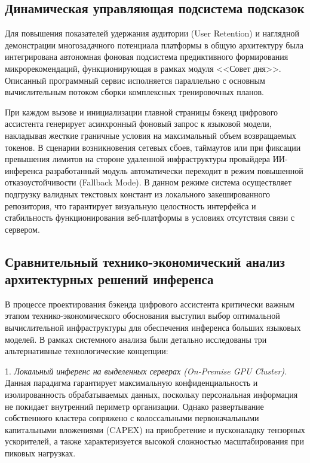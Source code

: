 \documentclass[14pt, a4paper]{extarticle}
\begin{document}
\subsection{Динамическая управляющая подсистема подсказок}

Для повышения показателей удержания аудитории (User Retention) и наглядной демонстрации многозадачного потенциала платформы в общую архитектуру была интегрирована автономная фоновая подсистема предиктивного формирования микрорекомендаций, функционирующая в рамках модуля <<Совет дня>>. Описанный программный сервис исполняется параллельно с основным вычислительным потоком сборки комплексных тренировочных планов.

При каждом вызове и инициализации главной страницы бэкенд цифрового ассистента генерирует асинхронный фоновый запрос к языковой модели, накладывая жесткие граничные условия на максимальный объем возвращаемых токенов. В сценарии возникновения сетевых сбоев, таймаутов или при фиксации превышения лимитов на стороне удаленной инфраструктуры провайдера ИИ-инференса разработанный модуль автоматически переходит в режим повышенной отказоустойчивости (Fallback Mode). В данном режиме система осуществляет подгрузку валидных текстовых констант из локального закешированного репозитория, что гарантирует визуальную целостность интерфейса и стабильность функционирования веб-платформы в условиях отсутствия связи с сервером.



\subsection{Сравнительный технико-экономический анализ архитектурных решений инференса}

В процессе проектирования бэкенда цифрового ассистента критически важным этапом технико-экономического обоснования выступил выбор оптимальной вычислительной инфраструктуры для обеспечения инференса больших языковых моделей. В рамках системного анализа были детально исследованы три альтернативные технологические концепции:

1. \textit{Локальный инференс на выделенных серверах (On-Premise GPU Cluster).} Данная парадигма гарантирует максимальную конфиденциальность и изолированность обрабатываемых данных, поскольку персональная информация не покидает внутренний периметр организации. Однако развертывание собственного кластера сопряжено с колоссальными первоначальными капитальными вложениями (CAPEX) на приобретение и пусконаладку тензорных ускорителей, а также характеризуется высокой сложностью масштабирования при пиковых нагрузках.
\end{document}
